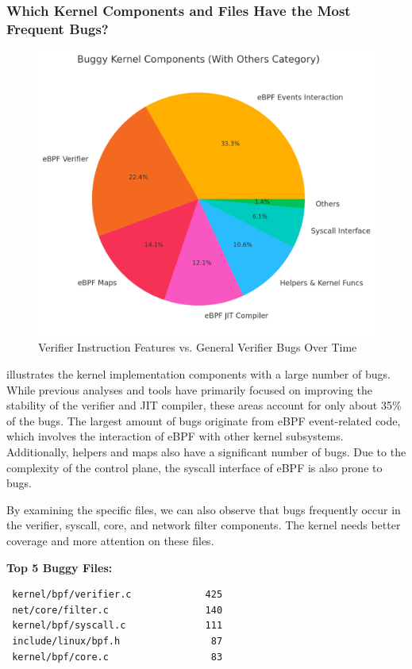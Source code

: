 \subsubsection{Which Kernel Components and Files Have the Most Frequent Bugs?}

\begin{figure}[ht]
    \centering
    \includegraphics[width=\linewidth]{feature-analysis/commit_pie_buggy_kernel_componenet.png}
    \caption{Verifier Instruction Features vs. General Verifier Bugs Over Time}
    \label{fig:buggy_kernel_component}
\end{figure}

 illustrates the kernel implementation components with a large number of bugs. While previous analyses and tools have primarily focused on improving the stability of the verifier and JIT compiler, these areas account for only about 35\% of the bugs. The largest amount of bugs originate from eBPF event-related code, which involves the interaction of eBPF with other kernel subsystems. Additionally, helpers and maps also have a significant number of bugs. Due to the complexity of the control plane, the syscall interface of eBPF is also prone to bugs.

By examining the specific files, we can also observe that bugs frequently occur in the verifier, syscall, core, and network filter components. The kernel needs better coverage and more attention on these files.

\textbf{Top 5 Buggy Files:}
\begin{verbatim}
 kernel/bpf/verifier.c             425
 net/core/filter.c                 140
 kernel/bpf/syscall.c              111
 include/linux/bpf.h                87
 kernel/bpf/core.c                  83
\end{verbatim}


